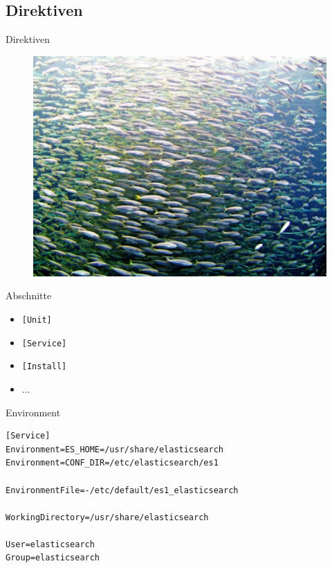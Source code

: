 \subsection{Direktiven}

\begin{frame}{Direktiven}
  \begin{figure}[!ht]
     \centering
     \includegraphics[width=0.8\linewidth]{img/fish-22646_1920.jpg}
  \end{figure}
\end{frame}

\begin{frame}[fragile]{Abschnitte}
	\begin{itemize}
		\item \verb|[Unit]|
		\item \verb|[Service]|
		\item \verb|[Install]|
	        \item ...

	\end{itemize}	
\end{frame}

\begin{frame}[fragile]{Environment}
\begin{lstlisting}
[Service]	
Environment=ES_HOME=/usr/share/elasticsearch
Environment=CONF_DIR=/etc/elasticsearch/es1

EnvironmentFile=-/etc/default/es1_elasticsearch

WorkingDirectory=/usr/share/elasticsearch

User=elasticsearch
Group=elasticsearch
\end{lstlisting}
\end{frame}

